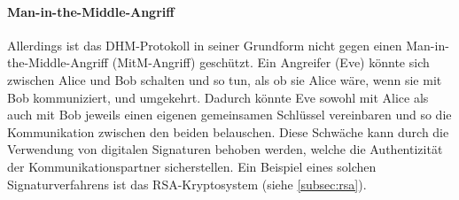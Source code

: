 \paragraph*{Man-in-the-Middle-Angriff}
Allerdings ist das \gls{DHM}-Protokoll in seiner Grundform nicht gegen einen Man-in-the-Middle-Angriff (\acrshort{MitM}-Angriff) geschützt. Ein Angreifer (Eve) könnte sich zwischen Alice und Bob schalten und so tun, als ob sie Alice wäre, wenn sie mit Bob kommuniziert, und umgekehrt. Dadurch könnte Eve sowohl mit Alice als auch mit Bob jeweils einen eigenen gemeinsamen Schlüssel vereinbaren und so die Kommunikation zwischen den beiden belauschen. Diese Schwäche kann durch die Verwendung von digitalen Signaturen behoben werden, welche die Authentizität der Kommunikationspartner sicherstellen. Ein Beispiel eines solchen Signaturverfahrens ist das \acrshort{RSA}-Kryptosystem (siehe \cref{subsec:rsa}).
